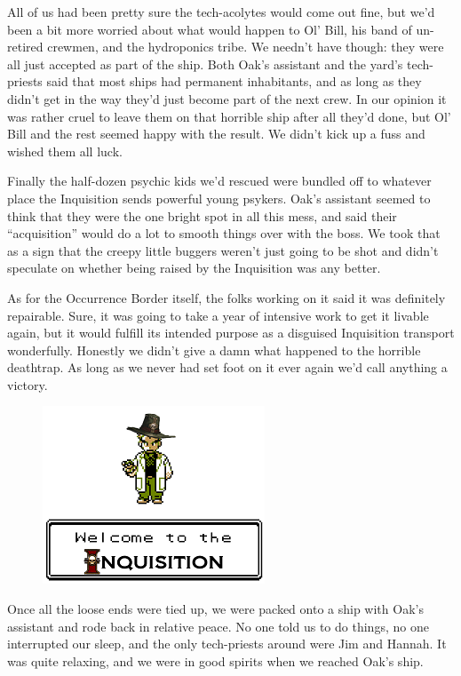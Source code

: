 All of us had been pretty sure the tech-acolytes would come out fine, but we’d been a bit more worried about what would happen to Ol’ Bill, his band of un-retired crewmen, and the hydroponics tribe. 
We needn’t have though: 
they were all just accepted as part of the ship. 
Both Oak’s assistant and the yard’s tech-priests said that most ships had permanent inhabitants, and as long as they didn’t get in the way they’d just become part of the next crew. 
In our opinion it was rather cruel to leave them on that horrible ship after all they’d done, but Ol’ Bill and the rest seemed happy with the result. 
We didn’t kick up a fuss and wished them all luck.

Finally the half-dozen psychic kids we’d rescued were bundled off to whatever place the Inquisition sends powerful young psykers. 
Oak’s assistant seemed to think that they were the one bright spot in all this mess, and said their “acquisition” would do a lot to smooth things over with the boss. 
We took that as a sign that the creepy little buggers weren’t just going to be shot and didn’t speculate on whether being raised by the Inquisition was any better.

As for the Occurrence Border itself, the folks working on it said it was definitely repairable. 
Sure, it was going to take a year of intensive work to get it livable again, but it would fulfill its intended purpose as a disguised Inquisition transport wonderfully. 
Honestly we didn’t give a damn what happened to the horrible deathtrap. 
As long as we never had set foot on it ever again we’d call anything a victory.

\begin{figure}
	\begin{center}
		\includegraphics[width=\figwidth]{pics/7/54.png}
	\end{center}
\end{figure}
Once all the loose ends were tied up, we were packed onto a ship with Oak’s assistant and rode back in relative peace. 
No one told us to do things, no one interrupted our sleep, and the only tech-priests around were Jim and Hannah. 
It was quite relaxing, and we were in good spirits when we reached Oak’s ship.

